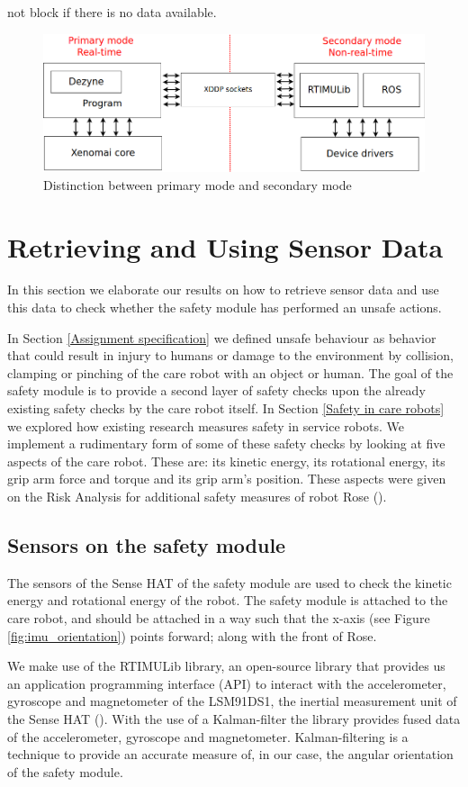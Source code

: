 \documentclass[12pt]{scrreprt}
\begin{document}
not block if there is no data available.

\begin{figure}[H]
    \centering
    \includegraphics[width=\textwidth]{Figures/results/communication_scheme.png}
    \caption{Distinction between primary mode and secondary mode}
    \label{fig:communication_scheme}
\end{figure}

\newpage
\section{Retrieving and Using Sensor Data}
\label{Retrieving and Using Sensor Data}
In this section we elaborate our results on how to retrieve sensor data and use this data to check whether the safety module has performed an unsafe actions.
\par
In Section \ref{Assignment specification} we defined unsafe behaviour as behavior that could result in injury to humans or damage to the environment by collision, clamping or pinching of the care robot with an object or human. The goal of the safety module is to provide a second layer of safety checks upon the already existing safety checks by the care robot itself. In Section \ref{Safety in care robots} we explored how existing research measures safety in service robots. We implement a rudimentary form of some of these safety checks by looking at five aspects of the care robot. These are: its kinetic energy, its rotational energy, its grip arm force and torque and its grip arm's position. These aspects were given on the Risk Analysis for additional safety measures of robot Rose (\cite{risk_analysis_additional}).

\subsection{Sensors on the safety module}
The sensors of the Sense HAT of the safety module are used to check the kinetic energy and rotational energy of the robot. The safety module is attached to the care robot, and should be attached in a way such that the x-axis (see Figure \ref{fig:imu_orientation}) points forward; along with the front of Rose.
\par
We make use of the RTIMULib library, an open-source library that provides us an application programming interface (API) to interact with the accelerometer, gyroscope and magnetometer of the LSM91DS1, the inertial measurement unit of the Sense HAT (\cite{rtimulib}). With the use of a Kalman-filter the library provides fused data of the accelerometer, gyroscope and magnetometer. Kalman-filtering is a technique to provide an accurate measure of, in our case, the angular orientation of the safety module.
\end{document}
